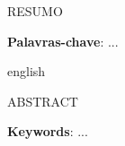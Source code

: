 



\setlength{\absparsep}{18pt} %
\begin{resumo}

	RESUMO

	\vspace{\onelineskip}
	\textbf{Palavras-chave}: ... 
\end{resumo}

\begin{resumo}[Abstract]
 \begin{otherlanguage*}{english}
	
	ABSTRACT
	
	\vspace{\onelineskip}
	\noindent 
	\textbf{Keywords}: ... 
 \end{otherlanguage*}
\end{resumo}


